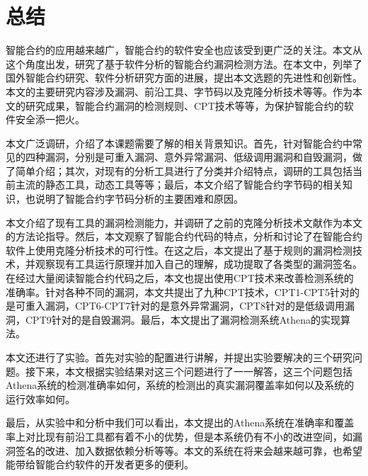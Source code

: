 \chapter{总结}


智能合约的应用越来越广，智能合约的软件安全也应该受到更广泛的关注。本文从这个角度出发，研究了基于软件分析的智能合约漏洞检测方法。在本文中，列举了国外智能合约研究、软件分析研究方面的进展，提出本文选题的先进性和创新性。本文的主要研究内容涉及漏洞、前沿工具、字节码以及克隆分析技术等等。作为本文的研究成果，智能合约漏洞的检测规则、CPT技术等等，为保护智能合约的软件安全添一把火。

本文广泛调研，介绍了本课题需要了解的相关背景知识。首先，针对智能合约中常见的四种漏洞，分别是可重入漏洞、意外异常漏洞、低级调用漏洞和自毁漏洞，做了简单介绍；其次，对现有的分析工具进行了分类并介绍特点，调研的工具包括当前主流的静态工具，动态工具等等；最后，本文介绍了智能合约字节码的相关知识，也说明了智能合约字节码分析的主要困难和原因。

本文介绍了现有工具的漏洞检测能力，并调研了之前的克隆分析技术文献作为本文的方法论指导。然后，本文观察了智能合约代码的特点，分析和讨论了在智能合约软件上使用克隆分析技术的可行性。在这之后，本文提出了基于规则的漏洞检测技术，并观察现有工具运行原理并加入自己的理解，成功提取了各类型的漏洞签名。在经过大量阅读智能合约代码之后，本文也提出使用CPT技术来改善检测系统的准确率。针对各种不同的漏洞，本文共提出了九种CPT技术，CPT1-CPT5针对的是可重入漏洞，CPT6-CPT7针对的是意外异常漏洞，CPT8针对的是低级调用漏洞，CPT9针对的是自毁漏洞。最后，本文提出了漏洞检测系统Athena的实现算法。

本文还进行了实验。首先对实验的配置进行讲解，并提出实验要解决的三个研究问题。接下来，本文根据实验结果对这三个问题进行了一一解答，这三个问题包括Athena系统的检测准确率如何，系统的检测出的真实漏洞覆盖率如何以及系统的运行效率如何。

最后，从实验中和分析中我们可以看出，本文提出的Athena系统在准确率和覆盖率上对比现有前沿工具都有着不小的优势，但是本系统仍有不小的改进空间，如漏洞签名的改进、加入数据依赖分析等等。本文的系统在将来会越来越可靠，也希望能带给智能合约软件的开发者更多的便利。